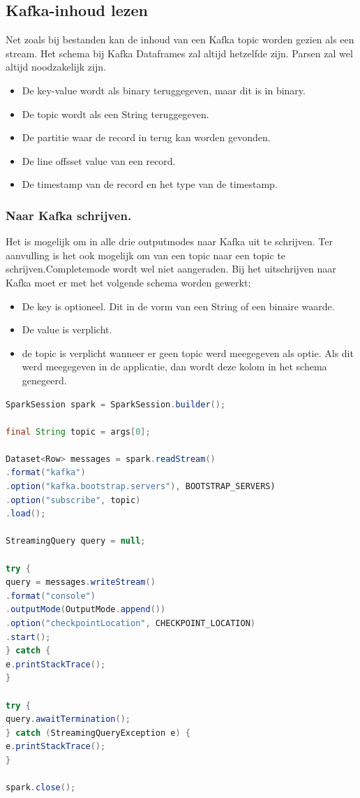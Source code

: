 \documentclass[a4paper,10pt,twoside]{report}
\begin{document}
\subsection{Kafka-inhoud lezen}

Net zoals bij bestanden kan de inhoud van een Kafka topic worden gezien als een stream. Het schema bij Kafka Dataframes zal altijd hetzelfde zijn. Parsen zal wel altijd noodzakelijk zijn.

\begin{itemize}
\item De key-value wordt als binary teruggegeven, maar dit is in binary. 
\item De topic wordt als een String teruggegeven.
\item De partitie waar de record in terug kan worden gevonden.
\item De line offsset value van een record.
\item De timestamp van de record en het type van de timestamp.
\end{itemize} 

\subsubsection{Naar Kafka schrijven.}

Het is mogelijk om in alle drie outputmodes naar Kafka uit te schrijven. Ter aanvulling is het ook mogelijk om van een topic naar een topic te schrijven.Completemode wordt wel niet aangeraden. Bij het uitschrijven naar Kafka moet er met het volgende schema worden gewerkt:

\begin{itemize}
\item De key is optioneel. Dit in de vorm van een String of een binaire waarde.
\item De value is verplicht. 
\item de topic is verplicht wanneer er geen topic werd meegegeven als optie. Als dit werd meegegeven in de applicatie, dan wordt deze kolom in het schema genegeerd.
\end{itemize}

\begin{lstlisting}[language=Java]
SparkSession spark = SparkSession.builder();

final String topic = args[0];

Dataset<Row> messages = spark.readStream()
.format("kafka")
.option("kafka.bootstrap.servers"), BOOTSTRAP_SERVERS)
.option("subscribe", topic)
.load();

StreamingQuery query = null;

try {
query = messages.writeStream()
.format("console")
.outputMode(OutputMode.append())
.option("checkpointLocation", CHECKPOINT_LOCATION)
.start();
} catch {
e.printStackTrace();
}

try {
query.awaitTermination();
} catch (StreamingQueryException e) {
e.printStackTrace();
}

spark.close();
\end{lstlisting}
\end{document}
